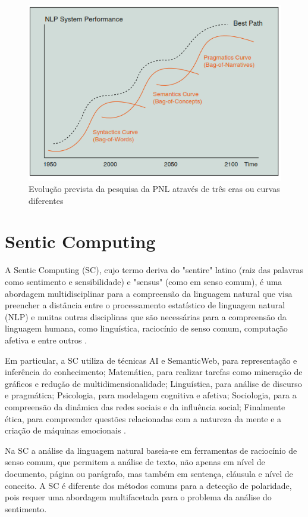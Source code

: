 \documentclass[
	12pt,				%
	openright,			%
	oneside,			%
	a4paper,			%
	english,			%
	spanish,			%
	brazil				%
	]{abntex2}
\begin{document}
\begin{figure}[!h]
\centering
\includegraphics{NLPCurve}
\caption{Evolução prevista da pesquisa da PNL através de três eras ou curvas diferentes \cite{book_Cambria2015}}
\label{NLPCurve}
\end{figure}

\section{Sentic Computing}

A Sentic Computing (SC), cujo termo deriva do "sentire" latino (raiz das palavras como sentimento e sensibilidade) e "sensus" (como em senso comum),  é uma abordagem multidisciplinar para a compreensão da linguagem natural que visa preencher a distância entre o processamento estatístico de linguagem natural (NLP) e muitas outras disciplinas que são necessárias para a compreensão da linguagem humana, como linguística, raciocínio de senso comum, computação afetiva e entre outros \cite{book_Cambria2015}.

Em particular, a SC utiliza de técnicas AI e SemanticWeb, para representação e inferência do conhecimento; Matemática, para realizar tarefas como mineração de gráficos e redução de multidimensionalidade; Linguística, para análise de discurso e pragmática; Psicologia, para modelagem cognitiva e afetiva; Sociologia, para a compreensão da dinâmica das redes sociais e da influência social; Finalmente ética, para compreender questões relacionadas com a natureza da mente e a criação de máquinas emocionais \cite{inBook_Bisio2017}.

Na SC a análise da linguagem natural baseia-se em ferramentas de raciocínio de senso comum, que permitem a análise de texto, não apenas em nível de documento, página ou parágrafo, mas também em sentença, cláusula e nível de conceito. A SC é diferente dos métodos comuns para a detecção de polaridade, pois requer uma abordagem multifacetada para o problema da análise do sentimento.
\end{document}
